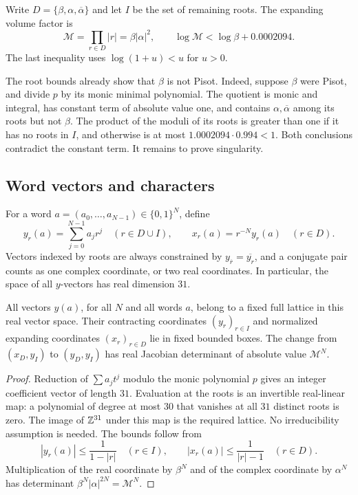 Write \(D=\{\beta,\alpha,\overline\alpha\}\) and let \(I\) be the set of
remaining roots. The expanding volume factor is
\begin{equation}
 \mathcal M=\prod_{r\in D}|r|=\beta|\alpha|^2,
 \qquad \log\mathcal M<\log\beta+0.0002094.
 \label{np:mahler}
\end{equation}
The last inequality uses \(\log(1+u)<u\) for \(u>0\).

The root bounds already show that \(\beta\) is not Pisot. Indeed, suppose
\(\beta\) were Pisot, and divide \(p\) by its monic minimal polynomial.
The quotient is monic and integral, has constant term of absolute value one,
and contains \(\alpha,\overline\alpha\) among its roots but not \(\beta\).
The product of the moduli of its roots is greater than one if it has no roots
in \(I\), and otherwise is at most
\(1.0002094\cdot0.994<1\). Both conclusions contradict the constant term.
It remains to prove singularity.

\subsection{Word vectors and characters}
\label{np:characters-section}

For a word \(a=(a_0,\ldots,a_{N-1})\in\{0,1\}^N\), define
\begin{equation}
 y_r(a)=\sum_{j=0}^{N-1}a_jr^j\quad(r\in D\cup I),
 \qquad x_r(a)=r^{-N}y_r(a)\quad(r\in D).
 \label{np:word-coordinates}
\end{equation}
Vectors indexed by roots are always constrained by
\(y_{\overline r}=\overline{y_r}\), and a conjugate pair counts as one complex
coordinate, or two real coordinates. In particular, the space of all
\(y\)-vectors has real dimension \(31\).

\begin{lemma}\label{np:lattice}
All vectors \(y(a)\), for all \(N\) and all words \(a\), belong to a fixed
full lattice in this real vector space. Their contracting coordinates
\((y_r)_{r\in I}\) and normalized expanding coordinates \((x_r)_{r\in D}\)
lie in fixed bounded boxes. The change from \((x_D,y_I)\) to \((y_D,y_I)\)
has real Jacobian determinant of absolute value \(\mathcal M^N\).
\end{lemma}

\begin{proof}
Reduction of \(\sum a_jt^j\) modulo the monic polynomial \(p\) gives an
integer coefficient vector of length \(31\). Evaluation at the roots is an
invertible real-linear map: a polynomial of degree at most \(30\) that
vanishes at all \(31\) distinct roots is zero. The image of \(\mathbb Z^{31}\)
under this map is the required lattice. No irreducibility assumption is
needed. The bounds follow from
\[
 |y_r(a)|\le\frac1{1-|r|}\quad(r\in I),\qquad
 |x_r(a)|\le\frac1{|r|-1}\quad(r\in D).
\]
Multiplication of the real coordinate by \(\beta^N\) and of the complex
coordinate by \(\alpha^N\) has determinant
\(\beta^N|\alpha|^{2N}=\mathcal M^N\).
\end{proof}

